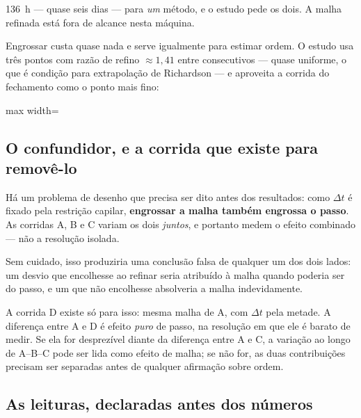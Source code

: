 \SI{136}{\hour} --- quase seis dias --- para \emph{um} m\'etodo, e o estudo pede
os dois. A malha refinada est\'a fora de alcance nesta m\'aquina.

Engrossar custa quase nada e serve igualmente para estimar ordem. O estudo usa
tr\^es pontos com raz\~ao de refino $\approx 1{,}41$ entre consecutivos --- quase
uniforme, o que \'e condi\c{c}\~ao para extrapola\c{c}\~ao de Richardson --- e
aproveita a corrida do fechamento como o ponto mais fino:

\begin{adjustbox}{max width=\linewidth}
\end{adjustbox}

\subsection{O confundidor, e a corrida que existe para remov\^e-lo}

H\'a um problema de desenho que precisa ser dito antes dos resultados: como
$\Delta t$ \'e fixado pela restri\c{c}\~ao capilar, \textbf{engrossar a malha
tamb\'em engrossa o passo}. As corridas A, B e C variam os dois \emph{juntos}, e
portanto medem o efeito combinado --- n\~ao a resolu\c{c}\~ao isolada.

Sem cuidado, isso produziria uma conclus\~ao falsa de qualquer um dos dois lados:
um desvio que encolhesse ao refinar seria atribu\'ido \`a malha quando poderia ser
do passo, e um que n\~ao encolhesse absolveria a malha indevidamente.

A corrida D existe s\'o para isso: mesma malha de A, com $\Delta t$ pela metade.
A diferen\c{c}a entre A e D \'e efeito \emph{puro} de passo, na resolu\c{c}\~ao em
que ele \'e barato de medir. Se ela for desprez\'ivel diante da diferen\c{c}a
entre A e C, a varia\c{c}\~ao ao longo de A--B--C pode ser lida como efeito de
malha; se n\~ao for, as duas contribui\c{c}\~oes precisam ser separadas antes de
qualquer afirma\c{c}\~ao sobre ordem.

\subsection{As leituras, declaradas antes dos n\'umeros}
\label{sec:conv-leituras}

